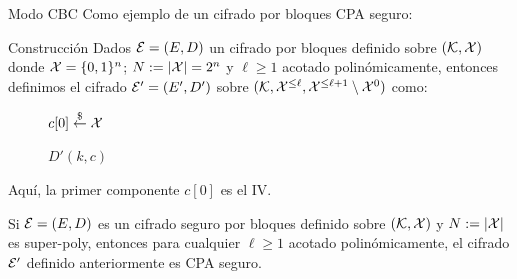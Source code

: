 \begin{frame}[allowframebreaks]{Modo CBC}
  Como ejemplo de un cifrado por bloques CPA seguro:
  \begin{block}{Construcción}
    Dados $\mathcal{E} = (E, D)$ un cifrado por bloques definido sobre $(\mathcal{K}, \mathcal{X})$ donde $\mathcal{X} = \{0, 1\}^n$;
    $N := |\mathcal{X}| = 2^n$ y $\ell \geq 1$ acotado polinómicamente, entonces definimos el cifrado 
    $\mathcal{E}' = (E', D')$ sobre $(\mathcal{K}, \mathcal{X}^{\leq\ell}, \mathcal{X}^{\leq\ell + 1}\setminus\mathcal{X}^0)$ como:
    \begin{figure}[h]
      \centering
      \begin{minipage}{0.48\textwidth}
        \begin{algorithm}[H]
          \DontPrintSemicolon
          \footnotesize
          \caption{$E'(k, m)$}
          $c[0] \overset{\$}{\leftarrow} \mathcal{X}$\;
        \end{algorithm}
      \end{minipage}
      \hfill
      \begin{minipage}{0.48\textwidth}
        \begin{algorithm}[H]
          \DontPrintSemicolon
          \footnotesize
          \caption{$D'(k, c)$}
        \end{algorithm}
      \end{minipage}
    \end{figure}
  \end{block}

  Aquí, la primer componente $c[0]$ es el IV.
  \begin{theorem}
    Si $\mathcal{E} = (E, D)$ es un cifrado seguro por bloques definido sobre $(\mathcal{K}, \mathcal{X})$ y $N := |\mathcal{X}|$
    es super-poly, entonces para cualquier $\ell\geq 1$ acotado polinómicamente, el cifrado 
    $\mathcal{E}'$ definido anteriormente es CPA seguro.


\end{theorem}
\end{frame}
